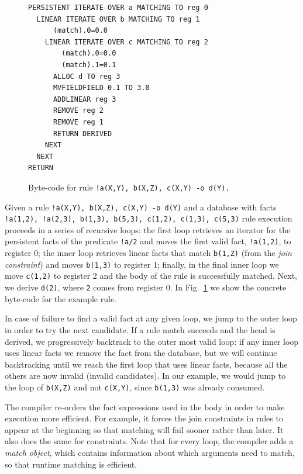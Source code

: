 \begin{figure}
   \vspace{-1\intextsep}
\scriptsize\begin{Verbatim}
PERSISTENT ITERATE OVER a MATCHING TO reg 0
  LINEAR ITERATE OVER b MATCHING TO reg 1
      (match).0=0.0
    LINEAR ITERATE OVER c MATCHING TO reg 2
        (match).0=0.0
        (match).1=0.1
      ALLOC d TO reg 3
      MVFIELDFIELD 0.1 TO 3.0
      ADDLINEAR reg 3
      REMOVE reg 2
      REMOVE reg 1
      RETURN DERIVED
    NEXT
  NEXT
RETURN
\end{Verbatim}
\caption{Byte-code for rule \texttt{!a(X,Y), b(X,Z), c(X,Y) -o d(Y).}}
\label{fig:byte_code}
\vspace{-1\intextsep}
\end{figure}

Given a rule \texttt{!a(X,Y), b(X,Z), c(X,Y) -o d(Y)} and a database with facts
\texttt{!a(1,2), !a(2,3), b(1,3), b(5,3), c(1,2), c(1,3), c(5,3)} rule execution proceeds
in a series of recursive loops: the first loop retrieves an iterator for the persistent facts
of the predicate \texttt{!a/2} and moves the first valid fact, \texttt{!a(1,2)},
to register 0; the inner loop retrieves linear facts that match \texttt{b(1,Z)} (from the
\emph{join constraint}) and moves \texttt{b(1,3)} to register 1; finally, in the final inner
loop we move \texttt{c(1,2)} to register 2 and the body of the rule is successfully matched. Next, we
derive \texttt{d(2)}, where \texttt{2} comes from register 0.
In Fig.~\ref{fig:byte_code} we show the concrete byte-code for the example rule.

In case of failure to find a valid fact at any given loop, we jump
to the outer loop in order to try the next candidate.
If a rule match succeeds and the head is derived, we progressively backtrack to the outer most valid loop:
if any inner loop uses linear facts we remove the fact from the database, but we will
continue backtracking until we reach the first loop that uses linear facts,
because all the others are now invalid (invalid candidates). In our example, we would jump to the
loop of \texttt{b(X,Z)} and not \texttt{c(X,Y)}, since \texttt{b(1,3)} was already consumed.

The compiler re-orders the fact expressions used in the body in order to make execution more
efficient. For example, it forces the join constraints in rules to appear at the beginning so
that matching will fail sooner rather than later. It also does the same for constraints.
Note that for every loop, the compiler adds a \emph{match object}, which contains information
about which arguments need to match, so that runtime matching is efficient.


